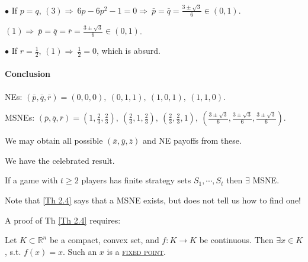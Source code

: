 $\bullet$ If $p=q$, $(3)\Longrightarrow\ 6p-6p^2-1=0\Longrightarrow \ \bar{p}=\bar{q} = \frac{3\pm \sqrt{3}}{6}\in(0, 1)$.

$(1)\Longrightarrow\ \bar{p} = \bar{q} = \bar{r} = \frac{3\pm\sqrt{3}}{6}\in(0, 1)$.

$\bullet$ If $r = \frac{1}{2}$, $(1) \Longrightarrow \ \frac{1}{2} = 0$, which is absurd.

\paragraph{Conclusion}
\par NEs: $(\bar{p}, \bar{q}, \bar{r}) = (0, 0, 0),\ (0, 1, 1), \ (1, 0, 1), \ (1, 1, 0)$.
\par MSNEs: $(\bar{p}, \bar{q}, \bar{r}) = (1, \frac{2}{3}, \frac{2}{3}),\ (\frac{2}{3}, 1, \frac{2}{3}),\ (\frac{2}{3}, \frac{2}{3}, 1), \ \left(\frac{3\pm\sqrt{3}}{6}, \frac{3\pm\sqrt{3}}{6}, \frac{3\pm\sqrt{3}}{6}\right)$.

We may obtain all possible $(\bar{x}, \bar{y}, \bar{z})$ and NE payoffs from these.

We have the celebrated result.

\setcounter{theorem}{3}
\begin{theorem}\label{Th 2.4}
    If a game with $t\geqslant 2$ players has finite strategy sets $S_1, \cdots, S_t$ then $\exists$ MSNE.
\end{theorem}

Note that \ref{Th 2.4} says that a MSNE exists, but does not tell us how to find one!

A proof of Th \ref{Th 2.4} requires:
\begin{theorem}\label{Th 2.5}
    Let $K\subset \mathbb{R}^n$ be a compact, convex set, and $f:K\to K$ be continuous. Then $\exists x\in K$, s.t. $f(x) = x$. Such an $x$ is a \uline{\textcolor{MarkerColour}{\textsc{fixed point}}}.
\end{theorem}

